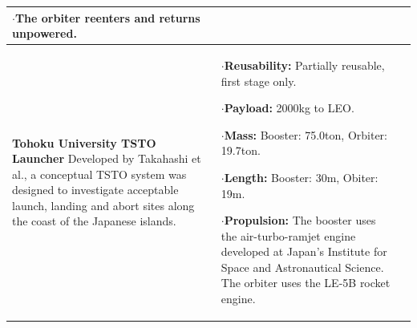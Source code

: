 {\begin{landscape}
\begin{xltabular}{\linewidth}{|X|X|X|}
	$\cdot$The orbiter reenters and returns unpowered. 
	
	\\
	\hline \small 
	\textbf{Tohoku University TSTO Launcher}\cite{Takahashi1997}\newline\newline
	Developed by Takahashi et al.\cite{Takahashi1997}, a conceptual TSTO system was designed to investigate acceptable launch, landing and abort sites along the coast of the Japanese islands. 
	&\small
	
	$\cdot$\textbf{Reusability:} Partially reusable, first stage only. 
	
	$\cdot$\textbf{Payload:} 2000kg to LEO. 
	
	$\cdot$\textbf{Mass:} Booster: 75.0ton, Orbiter: 19.7ton.
	
	$\cdot$\textbf{Length:} Booster: 30m,  Obiter: 19m.
	
	$\cdot$\textbf{Propulsion:} The booster uses the air-turbo-ramjet engine developed at Japan's Institute for Space and Astronautical Science. The orbiter uses the LE-5B rocket engine. 
	

\end{xltabular}
\end{landscape}}
